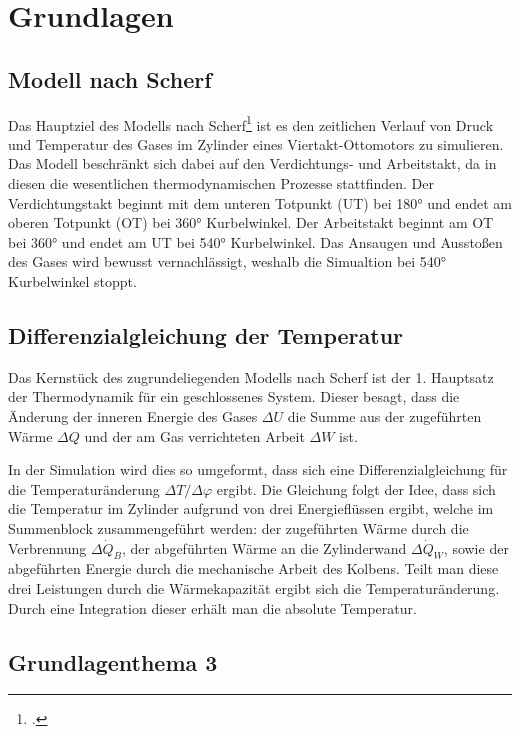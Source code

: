 \section{Grundlagen}

\subsection{Modell nach Scherf}
Das Hauptziel des Modells nach Scherf\footcite[prenote][94-101]{scherf2010} ist es den zeitlichen Verlauf von Druck und Temperatur des Gases im Zylinder eines Viertakt-Ottomotors zu simulieren.
Das Modell beschränkt sich dabei auf den Verdichtungs- und Arbeitstakt, da in diesen die wesentlichen thermodynamischen Prozesse stattfinden.
Der Verdichtungstakt beginnt mit dem unteren Totpunkt (UT) bei 180° und endet am oberen Totpunkt (OT) bei 360° Kurbelwinkel.
Der Arbeitstakt beginnt am OT bei 360° und endet am UT bei 540° Kurbelwinkel.
Das Ansaugen und Ausstoßen des Gases wird bewusst vernachlässigt, weshalb die Simualtion bei 540° Kurbelwinkel stoppt.

\subsection{Differenzialgleichung der Temperatur}
Das Kernstück des zugrundeliegenden Modells nach Scherf ist der 1. Hauptsatz der Thermodynamik für ein geschlossenes System. 
Dieser besagt, dass die Änderung der inneren Energie des Gases $\Delta U$ die Summe aus der zugeführten Wärme $\Delta Q$ und der am Gas verrichteten Arbeit $\Delta W$ ist.

In der Simulation wird dies so umgeformt, dass sich eine Differenzialgleichung für die Temperaturänderung $\Delta T / \Delta \varphi$  ergibt. 
Die Gleichung folgt der Idee, dass sich die Temperatur im Zylinder aufgrund von drei Energieflüssen ergibt, welche im Summenblock zusammengeführt werden: der zugeführten Wärme durch die Verbrennung $\Delta \dot{Q}_B$, der abgeführten Wärme an die Zylinderwand $\Delta \dot{Q}_W$, sowie der abgeführten Energie durch die mechanische Arbeit des Kolbens. 
Teilt man diese drei Leistungen durch die Wärmekapazität ergibt sich die Temperaturänderung. 
Durch eine Integration dieser erhält man die absolute Temperatur.

\subsection{Grundlagenthema 3}
